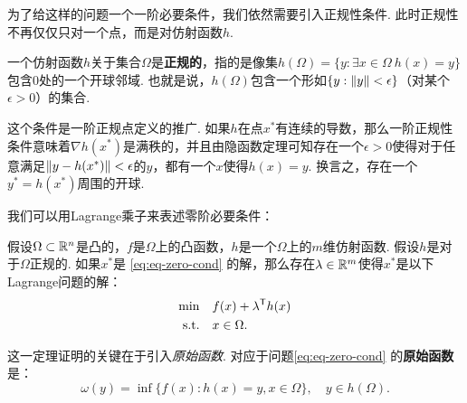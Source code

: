为了给这样的问题一个一阶必要条件，我们依然需要引入正规性条件. 此时正规性不再仅仅只对一个点，而是对仿射函数$h$.

\begin{definition}[正规性条件]
一个仿射函数${h}$关于集合$\Omega$是\textbf{正规的}，指的是像集$h(\Omega)=\{y:\exists x\in\Omega\ h(x)=y\}$包含${0}$处的一个开球邻域. 也就是说，$h(\Omega)$包含一个形如$\{y:\left\|y\right\|<\epsilon\}$（对某个$\epsilon>0$）的集合. 
\end{definition}

\begin{remark}
这个条件是一阶正规点定义的推广. 如果${h}$在点${x^\ast}$有连续的导数，那么一阶正规性条件意味着$\nabla{h(x^\ast)}$是满秩的，并且由隐函数定理可知存在一个$\epsilon>0$使得对于任意满足${\left\|y-h(x^\ast)\right\|}<\epsilon$的${y}$，都有一个${x}$使得${h(x)=y}$. 换言之，存在一个${y^\ast=h(x^\ast)}$周围的开球.
\end{remark}

我们可以用Lagrange乘子来表述零阶必要条件：
\begin{theorem}\label{thm:eq-zero-cond}
假设$\Omega\subset\mathbb{R}^n$是凸的，$f$是$\Omega$上的凸函数，${h}$是一个$\Omega$上的$m$维仿射函数. 假设${h}$是对于$\Omega$正规的. 如果${x^\ast}$是 \eqref{eq:eq-zero-cond} 的解，那么存在${\lambda}\in \mathbb{R}^m$使得${x^\ast}$是以下Lagrange问题的解：\begin{align*}
    \min\quad& f({x})+{\lambda^{\mathsf{T}} h(x)}\\
    \text{s.t.}\quad & x\in\Omega.
\end{align*}
\end{theorem}

这一定理证明的关键在于引入\emph{原始函数}. 对应于问题\eqref{eq:eq-zero-cond} 的\textbf{原始函数}是：$$\omega({y})=\inf\{f({x}):{h(x)=y,x}\in\Omega\},\quad y\in h(\Omega).$$


